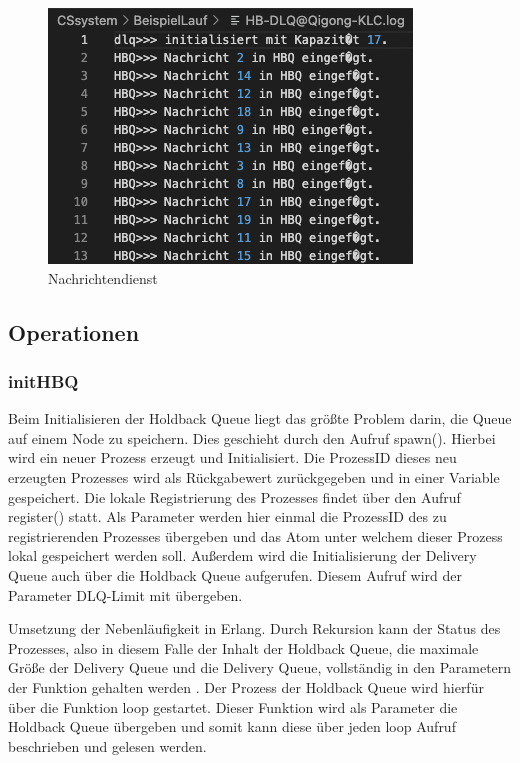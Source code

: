 \begin{figure}[htbp]
\begin{center}
\includegraphics[scale=0.6]{Bilder/HBQFilesEntry.png}
\caption{\label{fig:HBQFilesEntry} Nachrichtendienst \cite{HBQlogging}} 
\end{center}
\end{figure}

\subsection{Operationen}

\subsubsection{initHBQ}

Beim Initialisieren der Holdback Queue liegt das größte Problem darin, die Queue auf einem Node zu speichern. Dies geschieht durch den Aufruf spawn(). Hierbei wird ein neuer Prozess erzeugt und Initialisiert. Die ProzessID dieses neu erzeugten Prozesses wird als Rückgabewert zurückgegeben und in einer Variable gespeichert. 
Die lokale Registrierung des Prozesses findet über den Aufruf register() statt. Als Parameter werden hier einmal die ProzessID des zu registrierenden Prozesses übergeben und das Atom unter welchem dieser Prozess lokal gespeichert werden soll. 
Außerdem wird die Initialisierung der Delivery Queue auch über die Holdback Queue aufgerufen. Diesem Aufruf wird der Parameter DLQ-Limit mit übergeben. 

Umsetzung der Nebenläufigkeit in Erlang. Durch Rekursion kann der Status des Prozesses, also in diesem Falle der Inhalt der Holdback Queue, die maximale Größe der Delivery Queue und die Delivery Queue, vollständig in den Parametern der Funktion gehalten werden \cite{learnErlang}. Der Prozess der Holdback Queue wird hierfür über die Funktion loop gestartet. Dieser Funktion wird als Parameter die Holdback Queue übergeben und somit kann diese über jeden loop Aufruf beschrieben und gelesen werden. 

